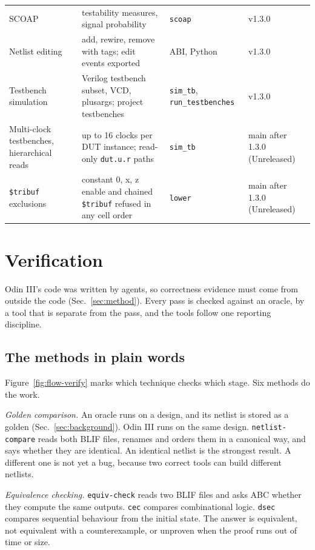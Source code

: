 \documentclass[conference]{IEEEtran}
\newcommand{\code}[1]{\texttt{#1}}
\begin{document}
\begin{table}[!tp]
\begin{tabular}{@{}>{\raggedright\arraybackslash}p{}%
  >{\raggedright\arraybackslash}p{}%
  >{\raggedright\arraybackslash}p{}p{}@{}}
SCOAP & testability measures, signal probability & \code{scoap} & v1.3.0 \\
Netlist editing & add, rewire, remove with tags; edit events exported & ABI, Python & v1.3.0 \\
Testbench simulation & Verilog testbench subset, VCD, plusargs; project testbenches
  & \code{sim\_tb}, \code{run\_testbenches} & v1.3.0 \\
Multi-clock testbenches, hierarchical reads & up to 16 clocks per DUT instance; read-only \code{dut.u.r} paths & \code{sim\_tb} & main after 1.3.0 (Unreleased) \\
\code{\$tribuf} exclusions & constant 0, x, z enable and chained \code{\$tribuf} refused in any cell order & \code{lower} & main after 1.3.0 (Unreleased) \\
\bottomrule
\end{tabular}
\end{table}

\section{Verification}
\label{sec:verify}

Odin III's code was written by agents, so correctness evidence must come from outside the code
(Sec.~\ref{sec:method}). Every pass is checked against an oracle, by a tool that is separate
from the pass, and the tools follow one reporting discipline.

\subsection{The methods in plain words}


Figure~\ref{fig:flow-verify} marks which technique checks which stage. Six methods do the work.

\emph{Golden comparison.} An oracle runs on a design, and its netlist is stored as a golden
(Sec.~\ref{sec:background}). Odin III runs on the same design. \code{netlist-compare} reads both
BLIF files, renames and orders them in a canonical way, and says whether they are identical. An
identical netlist is the strongest result. A different one is not yet a bug, because two correct
tools can build different netlists.

\emph{Equivalence checking.} \code{equiv-check} reads two BLIF files and asks ABC whether they
compute the same outputs. \code{cec} compares combinational logic. \code{dsec} compares
sequential behaviour from the initial state. The answer is equivalent, not equivalent with a
counterexample, or unproven when the proof runs out of time or size.
\end{document}
